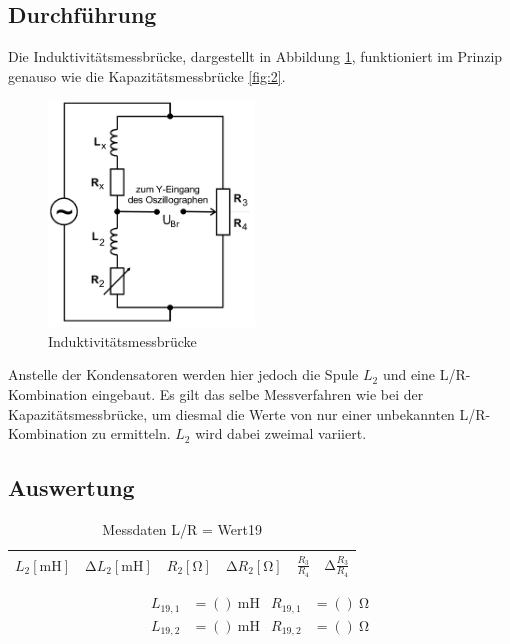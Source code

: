 \subsection{Durchführung}
Die Induktivitätsmessbrücke, dargestellt in Abbildung \ref{fig:3}, funktioniert im Prinzip genauso wie die Kapazitätsmessbrücke \ref{fig:2}.
\begin{figure}[H]
  \centering
  \includegraphics[height=6cm]{indu.png}
  \caption{Induktivitätsmessbrücke \cite{sample}}
  \label{fig:3}
\end{figure}
Anstelle der Kondensatoren werden hier jedoch die Spule $L_2$ und eine L/R-Kombination eingebaut.
Es gilt das selbe Messverfahren wie bei der Kapazitätsmessbrücke, um diesmal die Werte von nur einer unbekannten L/R-Kombination zu ermitteln.
$L_2$ wird dabei zweimal variiert.
\subsection{Auswertung}
\begin{table}
  \centering
  \caption{Messdaten L/R = Wert19}
  \label{tab:6}
  \begin{tabular}{c c c c c c}
    \toprule
    {$L_2 [\si{\milli\henry}]$} & {$\increment L_2 [\si{\milli\henry}]$} & {$R_2 [\si{\ohm}]$} & {$\increment R_2 [\si{\ohm}]$} & {$\frac{R_3}{R_4}$} & {$\increment \frac{R_3}{R_4}$} \\
    \midrule
    
    \bottomrule
  \end{tabular}
\end{table}

\begin{align}
  L_{19,1}   &= ()\:\si{\milli\henry} & R_{19,1} &= ()\:\si{\ohm}\\
  L_{19,2}   &= ()\:\si{\milli\henry} & R_{19,2} &= ()\:\si{\ohm}
\end{align}


